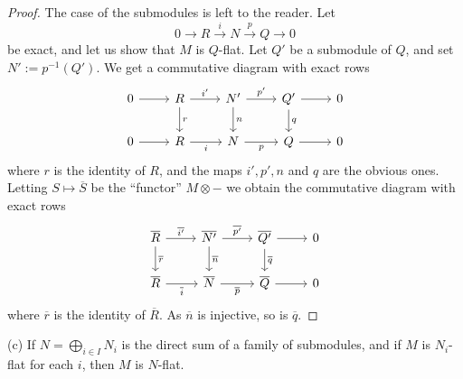 \documentclass[parskip=half,fontsize=12pt]{scrartcl}%
\begin{document}
\begin{proof} 
The case of the submodules is left to the reader. Let 
$$
0\to R\xrightarrow iN\xrightarrow pQ\to0
$$ 
be exact, and let us show that $M$ is $Q$-flat. Let $Q'$ be a submodule of $Q$, and set $N':=p^{-1}(Q')$. We get a commutative diagram with exact rows
$$
\begin{tikzcd}
0\ar[r]&R\ar[d,"r"]\ar[r,"i'"]&N'\ar[d,"n"]\ar[r,"p'"]& Q'\ar[d,"q"]\ar[r]&0\\ 
0\ar[r]&R\ar[r,"i"']&N\ar[r,"p"']& Q\ar[r]&0
\end{tikzcd}
$$ 
where $r$ is the identity of $R$, and the maps $i',p',n$ and $q$ are the obvious ones. Letting $S\mapsto\overline S$ be the ``functor'' $M\otimes-$ we obtain the commutative diagram with exact rows
$$
\begin{tikzcd}
\overline R\ar[d,"\overline r"]\ar[r,"\overline{i'}"]&\overline{N'}\ar[d,"\overline n"]\ar[r,"\overline{p'}"]& \overline{Q'}\ar[d,"\overline q"]\ar[r]&0\\ 
\overline R\ar[r,"\overline i"']&\overline N\ar[r,"\overline p"']& \overline Q\ar[r]&0
\end{tikzcd}
$$ 
where $\overline r$ is the identity of $\overline R$. As $\overline n$ is injective, so is $\overline q$. 
\end{proof}

(c) If $N=\bigoplus_{i\in I}N_i$ is the direct sum of a family of submodules, and if $M$ is $N_i$-flat for each $i$, then $M$ is $N$-flat.%
\end{document}
